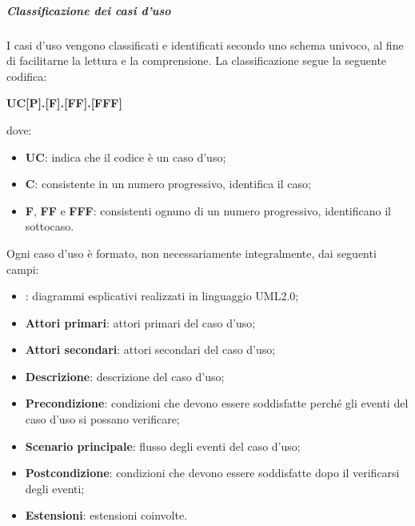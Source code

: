 \documentclass[../norme-di-progetto.tex]{subfiles}
\begin{document}
\subparagraph{Classificazione dei casi d'uso}
I casi d'uso vengono classificati e identificati secondo uno schema univoco, al fine di facilitarne la lettura e la comprensione. La classificazione segue la seguente codifica: \\
\begin{center}
  \centering
  \textbf{UC[P].[F].[FF].[FFF]}
\end{center} dove:
\begin{itemize}
  \item \textbf{UC}: indica che il codice è un caso d'uso;
  \item \textbf{C}: consistente in un numero progressivo, identifica il caso;
  \item \textbf{F}, \textbf{FF} e \textbf{FFF}: consistenti ognuno di un numero progressivo, identificano il sottocaso.
\end{itemize}
Ogni caso d'uso è formato, non necessariamente integralmente, dai seguenti campi:
\begin{itemize}
  \item \textbf{}: diagrammi esplicativi realizzati in linguaggio UML2.0;
  \item \textbf{Attori primari}: attori primari del caso d'uso;
  \item \textbf{Attori secondari}: attori secondari del caso d'uso;
  \item \textbf{Descrizione}: descrizione del caso d'uso;
  \item \textbf{Precondizione}: condizioni che devono essere soddisfatte perché gli eventi del caso d'uso si possano verificare;
  \item \textbf{Scenario principale}: flusso degli eventi del caso d'uso;
  \item \textbf{Postcondizione}: condizioni che devono essere soddisfatte dopo il verificarsi degli eventi;
  \item \textbf{Estensioni}: estensioni coinvolte.
\end{itemize}
\end{document}
